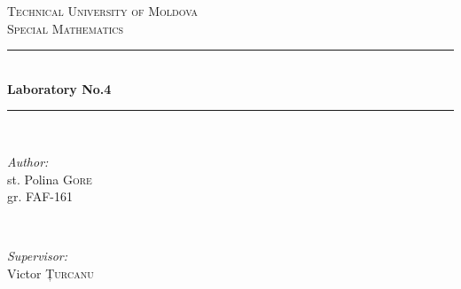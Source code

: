 \documentclass{article}
\begin{document}
  \begin{titlepage}

    \newcommand{\HRule}{\rule{\linewidth}{0.5mm}} %

    \center %


    \textsc{\LARGE Technical University of Moldova}\\[1.5cm]
    \textsc{\Large Special Mathematics}\\[0.5cm] %


    \HRule \\[0.4cm]
    { \huge \bfseries Laboratory No.4}\\[0.4cm] %
    \HRule \\[1.5cm]


    \begin{minipage}{0.4\textwidth}
      \begin{flushleft} \large
        \emph{Author:}\\
          st. Polina \textsc{Gore}\\ gr. FAF-161 %
      \end{flushleft}
    \end{minipage}
~
    \begin{minipage}{0.4\textwidth}
      \begin{flushright} \large
        \emph{Supervisor:} \\
        Victor \textsc{Țurcanu} %
      \end{flushright}
    \end{minipage}\\[2cm]



\end{titlepage}
\end{document}
